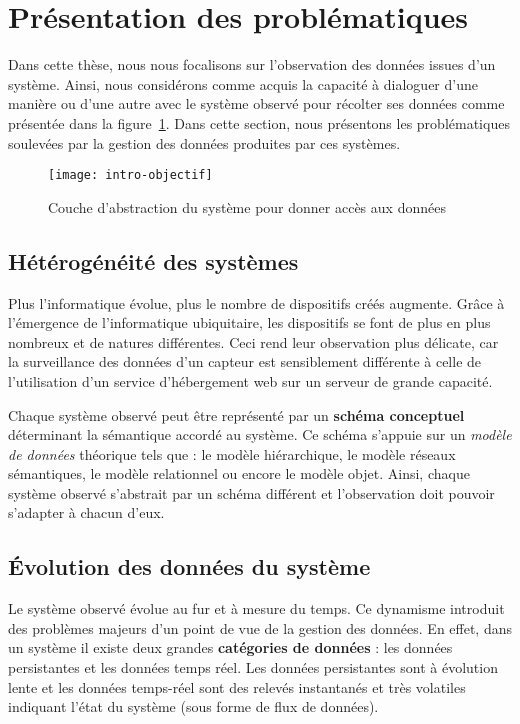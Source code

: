 \section{Présentation des problématiques}\label{sec:intro:problematique}
Dans cette thèse, nous nous focalisons sur l'observation des données issues d'un système. Ainsi, nous considérons comme acquis la capacité à dialoguer d'une manière ou d'une autre avec le système observé pour récolter ses données comme présentée dans la figure~\ref{fig:intro:objectif:abstraction}. Dans cette section, nous présentons les problématiques soulevées par la gestion des données produites par ces systèmes.

\begin{figure}[ht]
\centering
\texttt{[image: intro-objectif]}
\caption{Couche d'abstraction du système pour donner accès aux données}\label{fig:intro:objectif:abstraction}
\end{figure}

\subsection{Hétérogénéité des systèmes}
Plus l'informatique évolue, plus le nombre de dispositifs créés augmente. Grâce à l'émergence de l'informatique ubiquitaire, les dispositifs se font de plus en plus nombreux et de natures différentes. Ceci rend leur observation plus délicate, car la surveillance des données d'un capteur est sensiblement différente à celle de l'utilisation d'un service d'hébergement web sur un serveur de grande capacité.

Chaque système observé peut être représenté par un \textbf{schéma conceptuel} déterminant la sémantique accordé au système. Ce schéma s'appuie sur un \textit{modèle de données} théorique tels que : le modèle hiérarchique, le modèle réseaux sémantiques, le modèle relationnel ou encore le modèle objet. Ainsi, chaque système observé s'abstrait par un schéma différent et l'observation doit pouvoir s'adapter à chacun d'eux.

\subsection{Évolution des données du système}
Le système observé évolue au fur et à mesure du temps. Ce dynamisme introduit des problèmes majeurs d'un point de vue de la gestion des données. En effet, dans un système il existe deux grandes \textbf{catégories de données} : les données persistantes et les données temps réel. Les données persistantes sont à évolution lente et les données temps-réel sont des relevés instantanés et très volatiles indiquant l'état du système (sous forme de flux de données).

